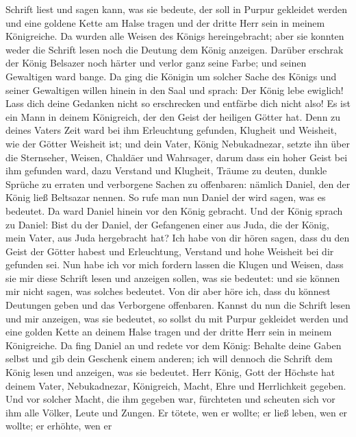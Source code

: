 Schrift liest und sagen kann, was sie bedeute, der soll in Purpur
gekleidet werden und eine goldene Kette am Halse tragen und der dritte
Herr sein in meinem Königreiche.  Da wurden alle Weisen des
Königs hereingebracht; aber sie konnten weder die Schrift lesen noch die
Deutung dem König anzeigen.  Darüber erschrak der König
Belsazer noch härter und verlor ganz seine Farbe; und seinen Gewaltigen
ward bange.  Da ging die Königin um solcher Sache des
Königs und seiner Gewaltigen willen hinein in den Saal und sprach: Der
König lebe ewiglich! Lass dich deine Gedanken nicht so erschrecken und
entfärbe dich nicht also!  Es ist ein Mann in deinem
Königreich, der den Geist der heiligen Götter hat. Denn zu deines Vaters
Zeit ward bei ihm Erleuchtung gefunden, Klugheit und Weisheit, wie der
Götter Weisheit ist; und dein Vater, König Nebukadnezar, setzte ihn über
die Sternseher, Weisen, Chaldäer und Wahrsager,  darum dass
ein hoher Geist bei ihm gefunden ward, dazu Verstand und Klugheit,
Träume zu deuten, dunkle Sprüche zu erraten und verborgene Sachen zu
offenbaren: nämlich Daniel, den der König ließ Beltsazar nennen. So rufe
man nun Daniel der wird sagen, was es bedeutet.  Da ward
Daniel hinein vor den König gebracht. Und der König sprach zu Daniel:
Bist du der Daniel, der Gefangenen einer aus Juda, die der König, mein
Vater, aus Juda hergebracht hat?  Ich habe von dir hören
sagen, dass du den Geist der Götter habest und Erleuchtung, Verstand und
hohe Weisheit bei dir gefunden sei.  Nun habe ich vor mich
fordern lassen die Klugen und Weisen, dass sie mir diese Schrift lesen
und anzeigen sollen, was sie bedeutet: und sie können mir nicht sagen,
was solches bedeutet.  Von dir aber höre ich, dass du
könnest Deutungen geben und das Verborgene offenbaren. Kannst du nun die
Schrift lesen und mir anzeigen, was sie bedeutet, so sollst du mit
Purpur gekleidet werden und eine golden Kette an deinem Halse tragen und
der dritte Herr sein in meinem Königreiche.  Da fing Daniel
an und redete vor dem König: Behalte deine Gaben selbst und gib dein
Geschenk einem anderen; ich will dennoch die Schrift dem König lesen und
anzeigen, was sie bedeutet.  Herr König, Gott der Höchste
hat deinem Vater, Nebukadnezar, Königreich, Macht, Ehre und Herrlichkeit
gegeben.  Und vor solcher Macht, die ihm gegeben war,
fürchteten und scheuten sich vor ihm alle Völker, Leute und Zungen. Er
tötete, wen er wollte; er ließ leben, wen er wollte; er erhöhte, wen er
